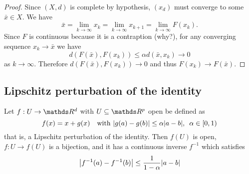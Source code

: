 \documentclass[12pt]{extarticle}
\numberwithin{equation}{section}
\begin{document}
\begin{proof}
	Since $(X, d)$ is complete by hypothesis, $(x_d)$ must converge to some $\bar x \in X$.
	We have
	\begin{equation}
		\bar x = \lim_{k \to \infty} x_k = \lim_{k \to \infty} x_{k + 1} = \lim_{k \to \infty} F(x_k).
	\end{equation}
	Since $F$ is continuous because it is a contraption (why?), for any converging sequence $x_k \to \bar x$ we have
	\begin{equation}
		d(F(\bar x), F(x_k)) \leq \alpha d(\bar x, x_k) \to 0
	\end{equation}
	as $k \to \infty$.
	Therefore $d(F(\bar x), F(x_k)) \to 0$ and thus $F(x_k) \to F(\bar x)$.
\end{proof}

\subsection{Lipschitz perturbation of the identity}

\begin{theorem}{}{}
	Let $f: U \to \R^d$ with $U \subseteq \R^p$ open be defined as
	\begin{equation}
		f(x) = x + g(x) \quad \text{with } \abs{g(a) - g(b)} \leq \alpha \abs{a - b}, \enspace \alpha \in [0,1)
	\end{equation}
	that is, a Lipschitz perturbation of the identity.
	Then $f(U)$ is open, $f: U \to f(U)$ is a bijection, and it has a continuous inverse $f^{-1}$
	which satisfies
	\begin{equation}
		\abs{f^{-1}(a)- f^{-1}(b)} \leq \frac{1}{1-\alpha} \abs{a-b}
	\end{equation}
\end{theorem}
\end{document}

